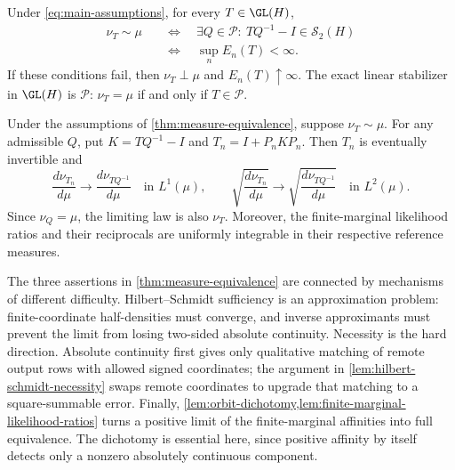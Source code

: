 \begin{theorem}
\label{thm:measure-equivalence}
Under \eqref{eq:main-assumptions}, for every \(T\in\GL(H)\),
\begin{equation}
 \boxed{\begin{aligned}
 \nu_T\sim\mu
 &\quad\Longleftrightarrow\quad
 \exists Q\in\mathcal P:\ TQ^{-1}-I\in\mathcal S_2(H)\\
 &\quad\Longleftrightarrow\quad \sup_nE_n(T)<\infty.
 \end{aligned}}
 \label{eq:measure-equivalence}
\end{equation}
If these conditions fail, then \(\nu_T\perp\mu\) and
\(E_n(T)\uparrow\infty\).  The exact linear stabilizer in \(\GL(H)\)
is \(\mathcal P\): \(\nu_T=\mu\) if and only if \(T\in\mathcal P\).
\end{theorem}

\begin{proposition}
\label{prop:finite-coordinate-approximants-recover-likelihood-ratio}
Under the assumptions of \cref{thm:measure-equivalence}, suppose
\(\nu_T\sim\mu\).
For any admissible \(Q\), put \(K=TQ^{-1}-I\) and
\(T_n=I+P_nKP_n\).  Then \(T_n\) is eventually invertible and
\begin{equation}
 \frac{d\nu_{T_n}}{d\mu}\longrightarrow\frac{d\nu_{TQ^{-1}}}{d\mu}
       \quad\text{in }L^1(\mu),
 \qquad
 \sqrt{\frac{d\nu_{T_n}}{d\mu}}
       \longrightarrow
 \sqrt{\frac{d\nu_{TQ^{-1}}}{d\mu}}
       \quad\text{in }L^2(\mu).
 \label{eq:likelihood-convergence}
\end{equation}
Since \(\nu_Q=\mu\), the limiting law is also \(\nu_T\).
Moreover, the finite-marginal likelihood ratios and their reciprocals are
uniformly integrable in their respective reference measures.
\end{proposition}

The three assertions in \cref{thm:measure-equivalence} are connected by
mechanisms of different difficulty.  Hilbert--Schmidt sufficiency is an
approximation problem: finite-coordinate half-densities must converge, and
inverse approximants must prevent the limit from losing two-sided absolute
continuity.  Necessity is the hard direction.  Absolute continuity first gives
only qualitative matching of remote output rows with allowed signed
coordinates; the argument in \cref{lem:hilbert-schmidt-necessity} swaps remote
coordinates to upgrade that matching to a square-summable error.  Finally,
\cref{lem:orbit-dichotomy,lem:finite-marginal-likelihood-ratios} turns a
positive limit of the finite-marginal affinities into full equivalence.  The
dichotomy is essential here, since positive affinity by itself detects only a
nonzero absolutely continuous component.

